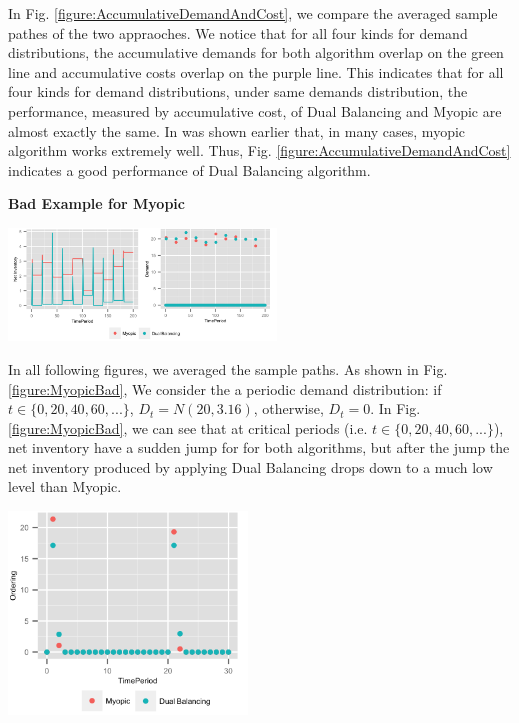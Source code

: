 \documentclass[twoside]{article}
\begin{document}
\begin{multicols}{2}
In Fig. \ref{figure:AccumulativeDemandAndCost}, we compare the averaged sample pathes of the two appraoches. We notice that for all four kinds for demand distributions, the accumulative demands for both algorithm overlap on the green line and accumulative costs overlap on the purple line. This indicates that for all four kinds for demand distributions, under same demands distribution, the performance, measured by accumulative cost, of Dual Balancing and Myopic are almost exactly the same. In was shown earlier\cite{CLAcha1} that, in many cases, myopic algorithm works extremely well. Thus, Fig. \ref{figure:AccumulativeDemandAndCost} indicates a good performance of Dual Balancing algorithm.

  \begin{center}
    \textbf{Bad Example for Myopic}
  \end{center}
  \begin{center}
    \label{figure:MyopicBad}
    \includegraphics[width=2.8in]{figures/MyopicBad.png}
  \end{center}
  In all following figures, we averaged the sample paths. As shown in Fig. \ref{figure:MyopicBad}, We consider the a periodic demand distribution: if $t\in \{0,20,40,60,...\}$, $D_t=N(20,3.16)$, otherwise, $D_t=0$.  In Fig. \ref{figure:MyopicBad}, we can see that at critical periods (i.e. $t\in \{0,20,40,60,...\}$), net inventory have a sudden jump for for both algorithms, but after the jump the net inventory produced by applying Dual Balancing drops down to a much low level than Myopic.
  \begin{center}
    \label{figure:MyopicBadOrderingWriteup}
    \includegraphics[width=2.5in]{figures/MyopicBadOrderingWriteup.png}

\end{center}
\end{multicols}
\end{document}

